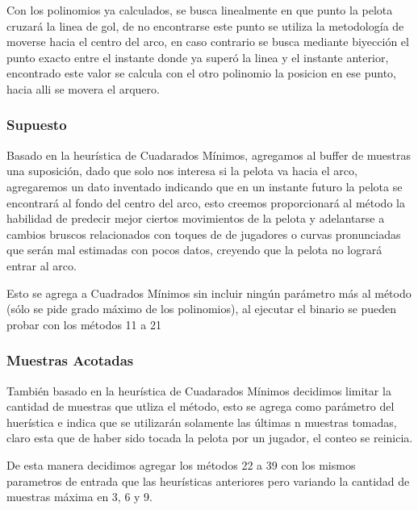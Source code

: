 Con los polinomios ya calculados, se busca linealmente en que punto la pelota cruzar\'a la linea de gol, de no encontrarse este punto se utiliza la metodolog\'ia de moverse hacia el centro del arco, en caso contrario se busca mediante biyecci\'on el punto exacto entre el instante donde ya super\'o la linea y el instante anterior, encontrado este valor se calcula con el otro polinomio la posicion en ese punto, hacia alli se movera el arquero.

\subsubsection{Supuesto}
Basado en la heur\'istica de Cuadarados M\'inimos, agregamos al buffer de muestras una suposici\'on, dado que solo nos interesa si la pelota va hacia el arco, agregaremos un dato inventado indicando que en un instante futuro la pelota se encontrar\'a al fondo del centro del arco, esto creemos proporcionar\'a al m\'etodo la habilidad de predecir mejor ciertos movimientos de la pelota y adelantarse a cambios bruscos relacionados con toques de de jugadores o curvas pronunciadas que ser\'an mal estimadas con pocos datos, creyendo que la pelota no lograr\'a entrar al arco.

Esto se agrega a Cuadrados M\'inimos sin incluir ning\'un par\'ametro m\'as al m\'etodo (s\'olo se pide grado m\'aximo de los polinomios), al ejecutar el binario se pueden probar con los m\'etodos 11 a 21


\subsubsection{Muestras Acotadas}
Tambi\'en basado en la heur\'istica de Cuadarados M\'inimos decidimos limitar la cantidad de muestras que utliza el m\'etodo, esto se agrega como par\'ametro del huer\'istica e indica que se utilizar\'an solamente las \'ultimas n muestras tomadas, claro esta que de haber sido tocada la pelota por un jugador, el conteo se reinicia.

De esta manera decidimos agregar los m\'etodos 22 a 39 con los mismos parametros de entrada que las heur\'isticas anteriores pero variando la cantidad de muestras m\'axima en 3, 6 y 9.
